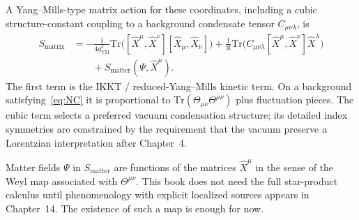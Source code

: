A Yang--Mills-type matrix action for these coordinates, including a
cubic structure-constant coupling to a background condensate tensor
\(C_{\mu\nu\lambda}\), is
\begin{equation}
  \label{eq:Smatrix}
  \begin{aligned}
    S_{\mathrm{matrix}}
    &=-\frac{1}{4g_{\mathrm{YM}}^2}
      \mathrm{Tr}\bigl(
        [\hat X^\mu,\hat X^\nu][\hat X_\mu,\hat X_\nu]
      \bigr)
      +\frac{1}{3!}
      \mathrm{Tr}\bigl(
        C_{\mu\nu\lambda}[\hat X^\mu,\hat X^\nu]\hat X^\lambda
      \bigr)\\
    &\qquad
      +S_{\mathrm{matter}}(\Psi,\hat X^\mu).
  \end{aligned}
\end{equation}
The first term is the IKKT / reduced-Yang--Mills kinetic term. On a
background satisfying~\eqref{eq:NC} it is proportional to
\(\mathrm{Tr}(\Theta_{\mu\nu}\Theta^{\mu\nu})\) plus fluctuation
pieces. The cubic term selects a preferred vacuum condensation
structure; its detailed index symmetries are constrained by the
requirement that the vacuum preserve a Lorentzian interpretation
after Chapter~4.

Matter fields \(\Psi\) in \(S_{\mathrm{matter}}\) are functions of the
matrices \(\hat X^\mu\) in the sense of the Weyl map associated with
\(\Theta^{\mu\nu}\). This book does not need the full star-product
calculus until phenomenology with explicit localized sources appears
in Chapter~14. The existence of such a map is enough for now.

